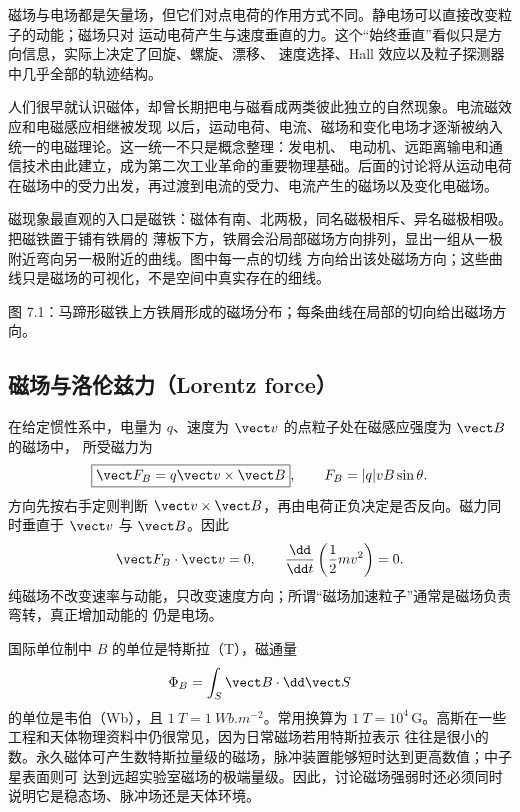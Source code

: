 磁场与电场都是矢量场，但它们对点电荷的作用方式不同。静电场可以直接改变粒子的动能；磁场只对
运动电荷产生与速度垂直的力。这个“始终垂直”看似只是方向信息，实际上决定了回旋、螺旋、漂移、
速度选择、Hall 效应以及粒子探测器中几乎全部的轨迹结构。

人们很早就认识磁体，却曾长期把电与磁看成两类彼此独立的自然现象。电流磁效应和电磁感应相继被发现
以后，运动电荷、电流、磁场和变化电场才逐渐被纳入统一的电磁理论。这一统一不只是概念整理：发电机、
电动机、远距离输电和通信技术由此建立，成为第二次工业革命的重要物理基础。后面的讨论将从运动电荷
在磁场中的受力出发，再过渡到电流的受力、电流产生的磁场以及变化电磁场。

磁现象最直观的入口是磁铁：磁体有南、北两极，同名磁极相斥、异名磁极相吸。把磁铁置于铺有铁屑的
薄板下方，铁屑会沿局部磁场方向排列，显出一组从一极附近弯向另一极附近的曲线。图中每一点的切线
方向给出该处磁场方向；这些曲线只是磁场的可视化，不是空间中真实存在的细线。

%
{图 7.1：马蹄形磁铁上方铁屑形成的磁场分布；每条曲线在局部的切向给出磁场方向。}

\subsection*{磁场与洛伦兹力（Lorentz force）}

在给定惯性系中，电量为 $q$、速度为 $\vect v$ 的点粒子处在磁感应强度为 $\vect B$ 的磁场中，
所受磁力为
\begin{equation}
  \boxed{\vect F_B=q\vect v\times\vect B},
  \qquad F_B=|q|vB\sin\theta .
\end{equation}
方向先按右手定则判断 $\vect v\times\vect B$，再由电荷正负决定是否反向。磁力同时垂直于
$\vect v$ 与 $\vect B$。因此
\begin{equation}
  \vect F_B\cdot\vect v=0,
  \qquad \frac{\dd}{\dd t}\left(\frac12mv^2\right)=0.
\end{equation}
纯磁场不改变速率与动能，只改变速度方向；所谓“磁场加速粒子”通常是磁场负责弯转，真正增加动能的
仍是电场。

\lorentzDirectionDiagram

国际单位制中 $B$ 的单位是特斯拉（T），磁通量
\begin{equation}
  \Phi_B=\int_S\vect B\cdot\dd\vect S
\end{equation}
的单位是韦伯（Wb），且 $\SI{1}{T}=\SI{1}{Wb.m^{-2}}$。常用换算为
$\SI{1}{T}=10^4\,\mathrm G$。高斯在一些工程和天体物理资料中仍很常见，因为日常磁场若用特斯拉表示
往往是很小的数。永久磁体可产生数特斯拉量级的磁场，脉冲装置能够短时达到更高数值；中子星表面则可
达到远超实验室磁场的极端量级。因此，讨论磁场强弱时还必须同时说明它是稳态场、脉冲场还是天体环境。


